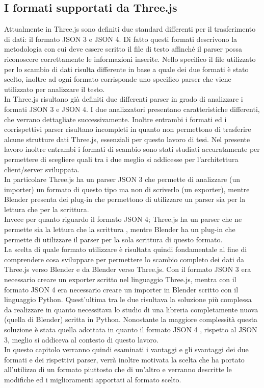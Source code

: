 \subsection{I formati supportati da Three.js}
Attualmente in Three.js sono definiti due standard differenti per il trasferimento di dati: il formato JSON 3 e JSON 4. Di fatto questi formati descrivono la metodologia con cui deve essere scritto il file di testo affinché il parser possa riconoscere correttamente le informazioni inserite.
Nello specifico il file utilizzato per lo scambio di dati risulta differente in base a quale dei due formati è stato scelto, inoltre ad ogni formato corrisponde uno specifico parser che viene utilizzato per analizzare il testo.
\\
In Three.js risultano già definiti due differenti parser in grado di analizzare i formati JSON 3 e JSON 4. I due analizzatori presentano caratteristiche differenti, che verrano dettagliate successivamente. Inoltre entrambi i formati ed i corrispettivi parser risultano incompleti in quanto non permettono di trasferire alcune strutture dati Three.js, essenziali per questo lavoro di tesi.
Nel presente lavoro inoltre entrambi i formati di scambio sono stati studiati accuratamente per permettere di scegliere quali tra i due meglio si addicesse per l’architettura client/server sviluppata.
\\
In particolare Three.js ha un parser JSON 3 che permette di analizzare (un importer) un formato di questo tipo ma non di scriverlo (un exporter), mentre Blender presenta dei plug-in che permettono di utilizzare un parser sia per la lettura che per la scrittura.
\\
Invece per quanto riguardo il formato JSON 4; Three.js ha un parser che ne permette sia la lettura che la scrittura , mentre Blender ha un plug-in che permette di utilizzare il parser per la sola scrittura di questo formato.
\\
La scelta di quale formato utilizzare è risultata quindi fondamentale al fine di comprendere cosa sviluppare per permettere lo scambio completo dei dati da Three.js verso Blender e da Blender verso Three.js.
Con il formato JSON 3 era necessario creare un exporter scritto nel linguaggio Three.js, mentra con il formato JSON 4 era necessario creare un importer in Blender scritto con il linguaggio Python.
Quest’ultima  tra le due risultava la soluzione più complessa da realizzare in quanto necessitava lo studio di una libreria completamente nuova (quella di Blender) scritta in Python.
Nonostante la maggiore complessità questa soluzione è stata quella adottata in quanto il formato JSON 4 , rispetto al JSON 3, meglio si addiceva al contesto di questo lavoro.
\\
In questo capitolo verranno quindi esaminati i vantaggi e gli svantaggi dei due formati e dei rispettivi parser, verrà inoltre motivata la scelta che ha portato all’utilizzo di un formato piuttosto che di un’altro e verranno descritte le modifiche ed i miglioramenti apportati al formato scelto.


